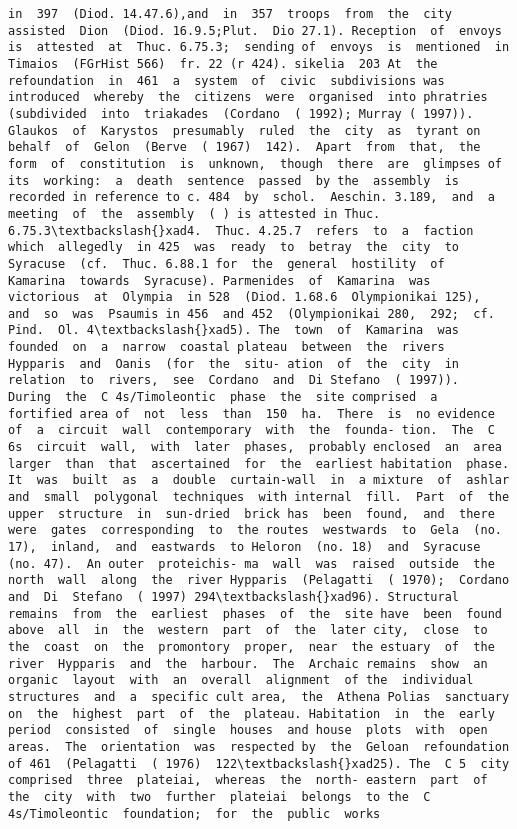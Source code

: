 \documentclass[11pt]{article}
\begin{document}
\begin{Verbatim}[commandchars=\\\{\}]
in  397  (Diod. 14.47.6),and  in  357  troops  from  the  city  assisted  Dion  (Diod. 16.9.5;Plut.  Dio 27.1). Reception  of  envoys  is  attested  at  Thuc. 6.75.3;  sending of  envoys  is  mentioned  in  Timaios  (FGrHist 566)  fr. 22 (r 424). sikelia  203 At  the  refoundation  in  461  a  system  of  civic  subdivisions was  introduced  whereby  the  citizens  were  organised  into phratries  (subdivided  into  triakades  (Cordano  ( 1992); Murray ( 1997)). Glaukos  of  Karystos  presumably  ruled  the  city  as  tyrant on  behalf  of  Gelon  (Berve  ( 1967)  142).  Apart  from  that,  the form  of  constitution  is  unknown,  though  there  are  glimpses of  its  working:  a  death  sentence  passed  by the  assembly  is recorded in reference to c. 484  by  schol.  Aeschin. 3.189,  and  a meeting  of  the  assembly  ( ) is attested in Thuc. 6.75.3\textbackslash{}xad4.  Thuc. 4.25.7  refers  to  a  faction  which  allegedly  in 425  was  ready  to  betray  the  city  to Syracuse  (cf.  Thuc. 6.88.1 for  the  general  hostility  of  Kamarina  towards  Syracuse). Parmenides  of  Kamarina  was  victorious  at  Olympia  in 528  (Diod. 1.68.6  Olympionikai 125),  and  so  was  Psaumis in 456  and 452  (Olympionikai 280,  292;  cf.  Pind.  Ol. 4\textbackslash{}xad5). The  town  of  Kamarina  was  founded  on  a  narrow  coastal plateau  between  the  rivers  Hypparis  and  Oanis  (for  the  situ- ation  of  the  city  in  relation  to  rivers,  see  Cordano  and  Di Stefano  ( 1997)).  During  the  C 4s/Timoleontic  phase  the  site comprised  a  fortified area of  not  less  than  150  ha.  There  is  no evidence  of  a  circuit  wall  contemporary  with  the  founda- tion.  The  C 6s  circuit  wall,  with  later  phases,  probably enclosed  an  area  larger  than  that  ascertained  for  the  earliest habitation  phase.  It  was  built  as  a  double  curtain-wall  in  a mixture  of  ashlar  and  small  polygonal  techniques  with internal  fill.  Part  of  the  upper  structure  in  sun-dried  brick has  been  found,  and  there  were  gates  corresponding  to  the routes  westwards  to  Gela  (no. 17),  inland,  and  eastwards  to Heloron  (no. 18)  and  Syracuse  (no. 47).  An outer  proteichis- ma  wall  was  raised  outside  the  north  wall  along  the  river Hypparis  (Pelagatti  ( 1970);  Cordano  and  Di  Stefano  ( 1997) 294\textbackslash{}xad96). Structural  remains  from  the  earliest  phases  of  the  site have  been  found  above  all  in  the  western  part  of  the  later city,  close  to the  coast  on  the  promontory  proper,  near  the estuary  of  the  river  Hypparis  and  the  harbour.  The  Archaic remains  show  an  organic  layout  with  an  overall  alignment  of the  individual  structures  and  a  specific cult area,  the  Athena Polias  sanctuary  on  the  highest  part  of  the  plateau. Habitation  in  the  early  period  consisted  of  single  houses  and house  plots  with  open  areas.  The  orientation  was  respected by  the  Geloan  refoundation  of 461  (Pelagatti  ( 1976)  122\textbackslash{}xad25). The  C 5  city  comprised  three  plateiai,  whereas  the  north- eastern  part  of  the  city  with  two  further  plateiai  belongs  to the  C 4s/Timoleontic  foundation;  for  the  public  works  
\end{Verbatim}
\end{document}
